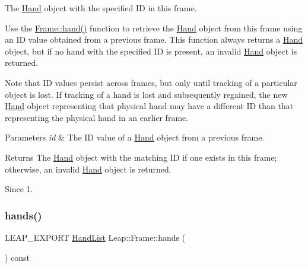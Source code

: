 The \hyperlink{class_leap_1_1_hand}{Hand} object with the specified ID in this frame.

Use the \hyperlink{class_leap_1_1_frame_aa5bfff6dba5e38bb779716ec309f1966}{Frame\+::hand()} function to retrieve the \hyperlink{class_leap_1_1_hand}{Hand} object from this frame using an ID value obtained from a previous frame. This function always returns a \hyperlink{class_leap_1_1_hand}{Hand} object, but if no hand with the specified ID is present, an invalid \hyperlink{class_leap_1_1_hand}{Hand} object is returned.


\begin{DoxyCodeInclude}
\end{DoxyCodeInclude}


Note that ID values persist across frames, but only until tracking of a particular object is lost. If tracking of a hand is lost and subsequently regained, the new \hyperlink{class_leap_1_1_hand}{Hand} object representing that physical hand may have a different ID than that representing the physical hand in an earlier frame.


\begin{DoxyParams}{Parameters}
{\em id} & The ID value of a \hyperlink{class_leap_1_1_hand}{Hand} object from a previous frame. \\
\hline
\end{DoxyParams}
\begin{DoxyReturn}{Returns}
The \hyperlink{class_leap_1_1_hand}{Hand} object with the matching ID if one exists in this frame; otherwise, an invalid \hyperlink{class_leap_1_1_hand}{Hand} object is returned. 
\end{DoxyReturn}
\begin{DoxySince}{Since}
1. 
\end{DoxySince}
\mbox{\label{class_leap_1_1_frame_ad1c4ed839718ce803f8fb884046ff2ca}} 
\subsubsection{\texorpdfstring{hands()}{hands()}}
{\footnotesize\ttfamily L\+E\+A\+P\+\_\+\+E\+X\+P\+O\+RT \hyperlink{class_leap_1_1_hand_list}{Hand\+List} Leap\+::\+Frame\+::hands (\begin{DoxyParamCaption}{ }\end{DoxyParamCaption}) const}

